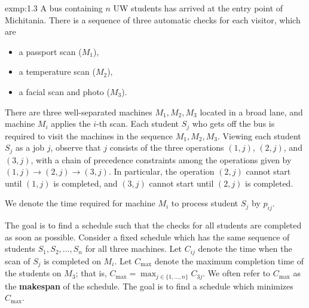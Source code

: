 \begin{exmp}{exmp:1.3}
    A bus containing $n$ UW students has arrived at the entry point of 
    Michitania. There is a sequence of three automatic checks for each 
    visitor, which are 
    \begin{itemize}
        \item a passport scan ($M_1$),
        \item a temperature scan ($M_2$), 
        \item a facial scan and photo ($M_3$).
    \end{itemize}
    There are three well-separated machines $M_1, M_2, M_3$ located in a 
    broad lane, and machine $M_i$ applies the $i$-th scan. Each student 
    $S_j$ who gets off the bus is required to visit the machines in the 
    sequence $M_1, M_2, M_3$. Viewing each student $S_j$ as a job $j$, 
    observe that $j$ consists of the three operations $(1, j)$, $(2, j)$, 
    and $(3, j)$, with a chain of precedence constraints among the 
    operations given by $(1, j) \to (2, j) \to (3, j)$. In particular, 
    the operation $(2, j)$ cannot start until $(1, j)$ is completed, 
    and $(3, j)$ cannot start until $(2, j)$ is completed. 

    We denote the time required for machine $M_i$ to process student 
    $S_j$ by $p_{ij}$. 

    The goal is to find a schedule such that the checks for all students 
    are completed as soon as possible. Consider a fixed schedule which 
    has the same sequence of students $S_1, S_2, \dots, S_n$ for all 
    three machines. Let $C_{ij}$ denote the time when the scan of $S_j$ 
    is completed on $M_i$. Let $C_{\max}$ denote the maximum completion 
    time of the students on $M_3$; that is, $C_{\max} = 
    \max_{j \in \{1, \dots, n\}} C_{3j}$. We often refer to 
    $C_{\max}$ as the {\bf makespan} of the schedule. The goal is to 
    find a schedule which minimizes $C_{\max}$.
    

\end{exmp}
